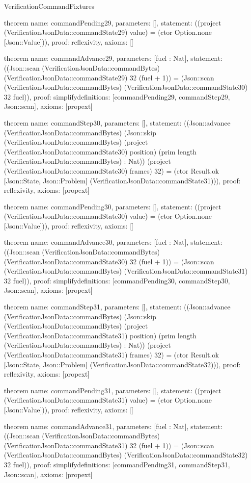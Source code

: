 \begin{lexlean}{VerificationCommandFixtures}
\begin{semanticmodule}
theorem{
  name: commandPending29,
  parameters: [],
  statement: ((project (VerificationJsonData::commandState29) value) = (ctor Option.none [Json::Value])),
  proof: reflexivity{},
  axioms: []
}

theorem{
  name: commandAdvance29,
  parameters: [fuel : Nat],
  statement: ((Json::scan (VerificationJsonData::commandBytes) (VerificationJsonData::commandState29) 32 (fuel + 1)) = (Json::scan (VerificationJsonData::commandBytes) (VerificationJsonData::commandState30) 32 fuel)),
  proof: simplify{definitions: [commandPending29, commandStep29, Json::scan]},
  axioms: [propext]
}

theorem{
  name: commandStep30,
  parameters: [],
  statement: ((Json::advance (VerificationJsonData::commandBytes) (Json::skip (VerificationJsonData::commandBytes) (project (VerificationJsonData::commandState30) position) (prim length (VerificationJsonData::commandBytes) : Nat)) (project (VerificationJsonData::commandState30) frames) 32) = (ctor Result.ok [Json::State, Json::Problem] (VerificationJsonData::commandState31))),
  proof: reflexivity{},
  axioms: [propext]
}

theorem{
  name: commandPending30,
  parameters: [],
  statement: ((project (VerificationJsonData::commandState30) value) = (ctor Option.none [Json::Value])),
  proof: reflexivity{},
  axioms: []
}

theorem{
  name: commandAdvance30,
  parameters: [fuel : Nat],
  statement: ((Json::scan (VerificationJsonData::commandBytes) (VerificationJsonData::commandState30) 32 (fuel + 1)) = (Json::scan (VerificationJsonData::commandBytes) (VerificationJsonData::commandState31) 32 fuel)),
  proof: simplify{definitions: [commandPending30, commandStep30, Json::scan]},
  axioms: [propext]
}

theorem{
  name: commandStep31,
  parameters: [],
  statement: ((Json::advance (VerificationJsonData::commandBytes) (Json::skip (VerificationJsonData::commandBytes) (project (VerificationJsonData::commandState31) position) (prim length (VerificationJsonData::commandBytes) : Nat)) (project (VerificationJsonData::commandState31) frames) 32) = (ctor Result.ok [Json::State, Json::Problem] (VerificationJsonData::commandState32))),
  proof: reflexivity{},
  axioms: [propext]
}

theorem{
  name: commandPending31,
  parameters: [],
  statement: ((project (VerificationJsonData::commandState31) value) = (ctor Option.none [Json::Value])),
  proof: reflexivity{},
  axioms: []
}

theorem{
  name: commandAdvance31,
  parameters: [fuel : Nat],
  statement: ((Json::scan (VerificationJsonData::commandBytes) (VerificationJsonData::commandState31) 32 (fuel + 1)) = (Json::scan (VerificationJsonData::commandBytes) (VerificationJsonData::commandState32) 32 fuel)),
  proof: simplify{definitions: [commandPending31, commandStep31, Json::scan]},
  axioms: [propext]
}


\end{semanticmodule}
\end{lexlean}
